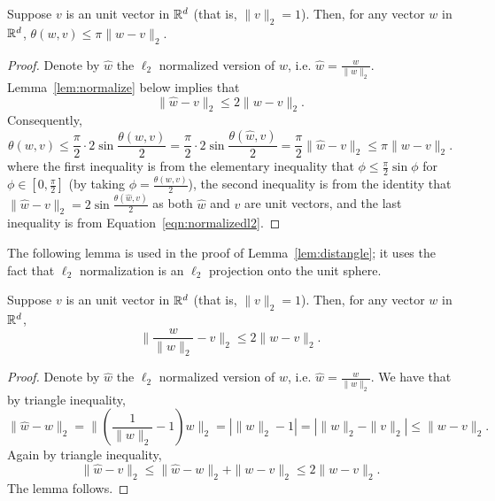 \begin{lemma}
Suppose $v$ is an unit vector in $\mathbb{R}^d$ (that is, $\|v\|_2 = 1$). Then, for any vector $w$ in $\mathbb{R}^d$,
$\theta(w,v) \leq \pi \| w - v \|_2$.
\label{lem:distangle}
\end{lemma}
\begin{proof}
Denote by $\hat{w}$ the $\ell_2$ normalized version of $w$, i.e. $\hat{w} = \frac{w}{\|w\|_2}$.
Lemma~\ref{lem:normalize} below implies that
\begin{equation}
	\| \hat{w} - v \|_2 \leq 2\| w - v \|_2.
	\label{eqn:normalizedl2}
\end{equation}
Consequently,
\[ \theta(w, v) \leq \frac{\pi}{2} \cdot 2\sin\frac{\theta(w, v)}{2} = \frac{\pi}{2} \cdot 2\sin\frac{\theta(\hat{w}, v)}{2} = \frac{\pi}{2} \| \hat{w} - v \|_2  \leq \pi \| w - v \|_2.\]
where the first inequality is from the elementary inequality that $\phi \leq \frac \pi 2 \sin \phi$ for $\phi \in [0,\frac \pi 2]$ (by taking $\phi = \frac{\theta(w, v)}{2}$),
the second inequality is from the identity that $\| \hat{w} - v\|_2 = 2\sin\frac{\theta(\hat{w}, v)}2$ as both $\hat{w}$ and $v$ are unit vectors, and the last inequality is
from Equation~\eqref{eqn:normalizedl2}.
\end{proof}

The following lemma is used in the proof of Lemma~\ref{lem:distangle}; it uses the fact that $\ell_2$ normalization is an $\ell_2$ projection onto the unit sphere.

\begin{lemma}
Suppose $v$ is an unit vector in $\mathbb{R}^d$ (that is, $\|v\|_2 = 1$). Then, for any vector $w$ in $\mathbb{R}^d$,
\[ \| \frac{w}{\|w\|_2} - v \|_2 \leq 2 \| w - v \|_2. \]
\label{lem:normalize}
\end{lemma}
\begin{proof}
Denote by $\hat{w}$ the $\ell_2$ normalized version of $w$, i.e. $\hat{w} = \frac{w}{\|w\|_2}$.
We have that by triangle inequality,
\[ \| \hat{w} - w \|_2 = \| (\frac{1}{\|w\|_2}-1) w \|_2 = | \| w \|_2  - 1 | = | \| w \|_2  - \| v \|_2 | \leq \| w - v \|_2. \]
Again by triangle inequality,
\[ \| \hat{w} - v \|_2 \leq \| \hat{w} - w \|_2 + \| w - v \|_2 \leq 2\| w - v \|_2. \]
The lemma follows.
\end{proof}

